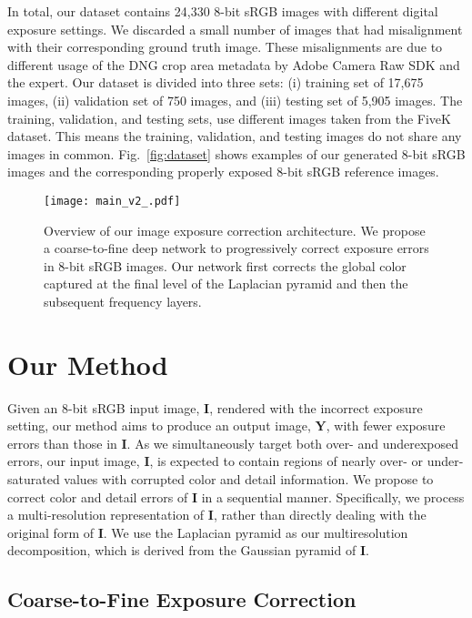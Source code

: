 \documentclass[final]{cvpr}
\begin{document}
In total, our dataset contains 24,330 8-bit sRGB images with different digital exposure settings. We discarded a small number of images that had misalignment with their corresponding ground truth image. These misalignments are due to different usage of the DNG crop area metadata by Adobe Camera Raw SDK and the expert. Our dataset is divided into three sets: (i) training set of 17,675 images, (ii) validation set of 750 images, and (iii) testing set of 5,905 images.   The training, validation, and testing sets, use different images taken from the FiveK dataset. This means the training, validation, and testing images do not share any images in common. Fig.\ \ref{fig:dataset} shows examples of our generated 8-bit sRGB images and the corresponding properly exposed 8-bit sRGB reference images.

\begin{figure*}[t]
\centering
\texttt{[image: main\_v2\_.pdf]}
\vspace{-6mm}
\caption{Overview of our image exposure correction architecture. We propose a coarse-to-fine deep network to progressively correct exposure errors in 8-bit sRGB images.
Our network first corrects the global color captured at the final level of the Laplacian pyramid and then the subsequent frequency layers.\vspace{-4mm}}
\label{fig:main}
\end{figure*}

\section{Our Method} \label{sec:method}
Given an 8-bit sRGB input image, $\mathbf{I}$, rendered with the incorrect exposure setting, our method aims to produce an output image, $\mathbf{Y}$, with fewer exposure errors than those in $\mathbf{I}$. As we simultaneously target both over- and underexposed errors, our input image, $\mathbf{I}$, is expected to contain regions of nearly over- or under-saturated values with corrupted color and detail information.
We propose to correct color and detail errors of $\mathbf{I}$ in a sequential manner. Specifically, we process a multi-resolution representation of $\mathbf{I}$, rather than directly dealing with the original form of $\mathbf{I}$. We use the Laplacian pyramid \cite{burt1983laplacian} as our multiresolution decomposition, which is derived  from the Gaussian pyramid of $\mathbf{I}$.

\subsection{Coarse-to-Fine Exposure Correction}
\end{document}
